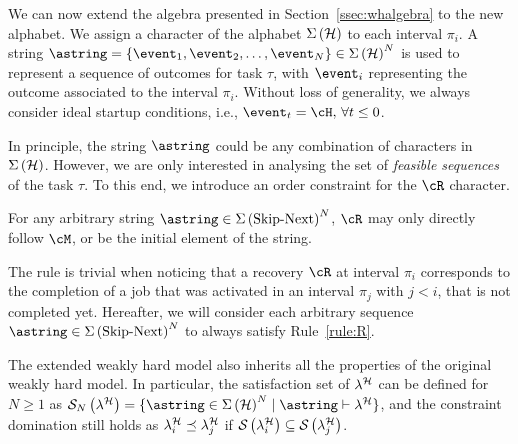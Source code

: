 %

We can now extend the algebra presented in Section~\ref{ssec:whalgebra} to the new alphabet.
We assign a character of the alphabet $\Sigma\left(\mathcal{H}\right)$ to each interval $\pi_i$.
A string $\astring = \{\event_1,\event_2,\dots,\event_N \} \in \Sigma\left(\strat\right)^N$ is used to represent a sequence of  outcomes for task $\tau$, with $\event_i$ representing the outcome associated to the interval $\pi_i$. 
Without loss of generality, we always consider ideal startup conditions, i.e., $\event_t=\cH, \, \forall t \leq 0$.

In principle, the string $\astring$ could be any combination of characters in $\Sigma\left(\mathcal{H}\right)$.
However, we are only interested in analysing the set of \emph{feasible sequences} of the task $\tau$.
To this end, we introduce an order constraint for the $\cR$ character.
%
\begin{rule_}%
    \label{rule:R}%
    For any arbitrary string $\astring \in \Sigma\left(\text{Skip-Next}\right)^N$, $\cR$ may only directly follow $\cM$, or be the initial element of the string.
\end{rule_}
%
The rule is trivial when noticing that a recovery $\cR$ at interval $\pi_i$ corresponds to the completion of a job that was activated in an interval $\pi_j$ with $j<i$, that is not completed yet.
Hereafter, we will consider each arbitrary sequence $\astring\in \Sigma\left(\text{Skip-Next}\right)^N$ to always satisfy Rule~\ref{rule:R}.

The extended weakly hard model also inherits all the properties of the original weakly hard model.
In particular, the satisfaction set of $\lambda^{\mathcal{H}}$ can be defined for $N\geq 1$ as $\sset{N}{\lambda^{\strat}} = \{ \astring \in \Sigma\left(\strat\right)^N \mid \astring \vdash \lambda^{\strat} \}$, and the constraint domination still holds as $\lambda^{\mathcal{H}}_{i} \preceq \lambda^{\mathcal{H}}_{j}$ if $\mathcal{S}_{}\left( \lambda^{\mathcal{H}}_{i}  \right) \subseteq \mathcal{S}_{}\left( \lambda^{\mathcal{H}}_{j} \right)$.
